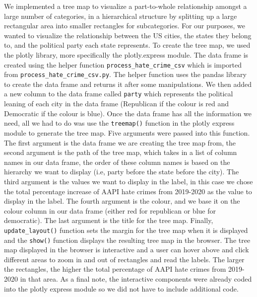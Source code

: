 \documentclass[fontsize=11pt]{article}
\begin{document}
    \quad We implemented a tree map to visualize a part-to-whole relationship amongst a large number of categories, in a hierarchical structure by splitting up a large rectangular area into smaller rectangles for subcategories. For our purposes, we wanted to visualize the relationship between the US cities, the states they belong to, and the political party each state represents. To create the tree map, we used the  plotly library, more specifically the plotly.express module. The data frame is created using the helper function \texttt{process\_hate\_crime\_csv} which is imported from \texttt{process\_hate\_crime\_csv.py}. The helper function uses the pandas library to create the data frame and returns it after some manipulations. We then added a new column to the data frame called \texttt{party} which represents the political leaning of each city in the data frame (Republican if the colour is red and Democratic if the colour is blue). Once the data frame has all the information we need, all we had to do was use the \texttt{treemap()} function in the plotly express module to generate the tree map. Five arguments were passed into this function. The first argument is the data frame we are creating the tree map from, the second argument is the path of the tree map, which takes in a list of column names in our data frame, the order of these column names is based on the hierarchy we want to display (i.e, party before the state before the city). The third argument is the values we want to display in the label, in this case we chose the total percentage increase of AAPI hate crimes from 2019-2020 as the value to display in the label. The fourth argument is the colour, and we base it on the colour column in our data frame (either red for republican or blue for democratic). The last argument is the title for the tree map. Finally, \texttt{update\_layout()} function sets the margin for the tree map when it is displayed and the \texttt{show()} function displays the resulting tree map in the browser. The tree map displayed in the browser is interactive and a user can hover above and click different areas to zoom in and out of rectangles and read the labels. The larger the rectangles, the higher the total percentage of AAPI hate crimes from 2019-2020 in that area. As a final note, the interactive components were already coded into the plotly express module so we did not have to include additional code.\\
\end{document}
